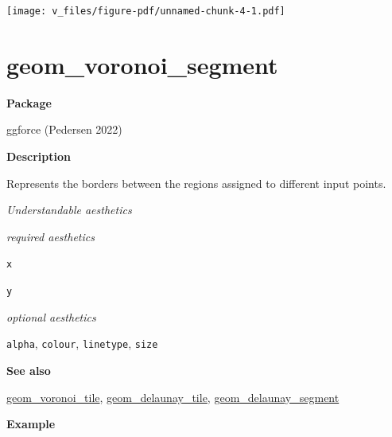 \documentclass[
  letterpaper,
  DIV=11,
  numbers=noendperiod]{scrreprt}
\begin{document}
\texttt{[image: v\_files/figure-pdf/unnamed-chunk-4-1.pdf]}

\section{geom\_voronoi\_segment}\label{geom_voronoi_segment}

\textbf{Package}

ggforce (Pedersen 2022)

\textbf{Description}

Represents the borders between the regions assigned to different input
points.

\emph{Understandable aesthetics}

\emph{required aesthetics}

\texttt{x}

\texttt{y}

\emph{optional aesthetics}

\texttt{alpha}, \texttt{colour}, \texttt{linetype}, \texttt{size}

\textbf{See also}

\hyperref[voroni_tile]{geom\_voronoi\_tile},
\hyperref[delaunay_tile]{geom\_delaunay\_tile},
\hyperref[delaunay_segment]{geom\_delaunay\_segment}

\textbf{Example}
\end{document}

